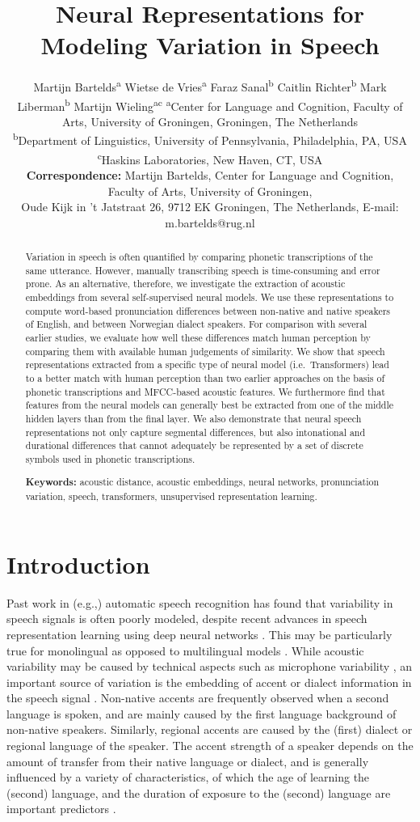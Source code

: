 \documentclass[11pt,a4paper]{article}
\title{Neural Representations for Modeling Variation in Speech}
\author{Martijn Bartelds\textsuperscript{\normalfont a} \And Wietse de Vries\textsuperscript{\normalfont a}
  \And Faraz Sanal\textsuperscript{\normalfont b} \AND Caitlin Richter\textsuperscript{\normalfont b}
  \And Mark Liberman\textsuperscript{\normalfont b} \And Martijn Wieling\textsuperscript{\normalfont ac} \AND
  \small \normalfont \textsuperscript{a}Center for Language and Cognition, Faculty of Arts, University of Groningen, Groningen, The Netherlands \\
  \small \normalfont \textsuperscript{b}Department of Linguistics, University of Pennsylvania, Philadelphia, PA, USA \\
  \small \normalfont \textsuperscript{c}Haskins Laboratories, New Haven, CT, USA \\ \AND
  \small \normalfont \textbf{Correspondence:} Martijn Bartelds, Center for Language and Cognition, Faculty of Arts, University of Groningen, \\
  \small \normalfont Oude Kijk in 't Jatstraat 26, 9712 EK Groningen, The Netherlands, E-mail: m.bartelds@rug.nl \\
  }
\date{}
\begin{document}
\maketitle
\begin{abstract}
Variation in speech is often quantified by comparing phonetic transcriptions of the same utterance. However, manually transcribing speech is time-consuming and error prone.
As an alternative, therefore, we investigate the extraction of acoustic embeddings from several self-supervised neural models. 
We use these representations to compute word-based pronunciation differences between non-native and native speakers of English, and between Norwegian dialect speakers. For comparison with several earlier studies, we evaluate how well these differences match human perception by comparing them with available human judgements of similarity. 
We show that speech representations extracted from a specific type of neural model (i.e.~Transformers) lead to a better match with human perception than two earlier approaches on the basis of phonetic transcriptions and MFCC-based acoustic features. We furthermore find that features from the neural models can generally best be extracted from one of the middle hidden layers than from the final layer. 
We also demonstrate that neural speech representations not only capture segmental differences, but also intonational and durational differences that cannot adequately be represented by a set of discrete symbols used in phonetic transcriptions.

\textbf{Keywords:} acoustic distance, acoustic embeddings, neural networks, pronunciation variation, speech, transformers, unsupervised representation learning.
\end{abstract}

\section{Introduction}
Past work in (e.g.,) automatic speech recognition has found that variability in speech signals is often poorly modeled, despite recent advances in speech representation learning using deep neural networks \citep{huang2014towards, huang2014comparative, koenecke2020}. This may be particularly true for monolingual as opposed to multilingual models \citep{zelasko20}.
While acoustic variability may be caused by technical aspects such as microphone variability \citep{mathur2019}, an important source of variation is the embedding of accent or dialect information in the speech signal \citep{hanani2013human, najafian2014unsupervised}.
Non-native accents are frequently observed when a second language is spoken, and are mainly caused by the first language background of non-native speakers. Similarly, regional accents are caused by the (first) dialect or regional language of the speaker.  
The accent strength of a speaker depends on the amount of transfer from their native language or dialect, and is generally influenced by a variety of characteristics, of which the age of learning the (second) language, and the duration of exposure to the (second) language are important predictors \citep{asher1969optimal, leather1983second, flege1988factors, wieling2014determinants}.
\end{document}
